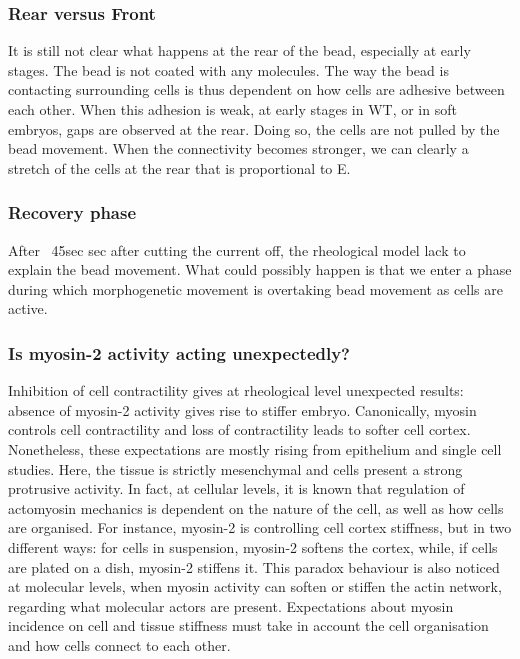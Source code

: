 \subsubsection{Rear versus Front}
It is still not clear what happens at the rear of the bead, especially at early stages.
The bead is not coated with any molecules.
The way the bead is contacting surrounding cells is thus dependent on how cells are adhesive between each other.
When this adhesion is weak, at early stages in WT, or in soft embryos, gaps are observed at the rear.
Doing so, the cells are not pulled by the bead movement.
When the connectivity becomes stronger, we can clearly a stretch of the cells at the rear that is proportional to E.

\subsubsection{Recovery phase}
After ~45sec sec after cutting the current off, the rheological model lack to explain the bead movement.
What could possibly happen is that we enter a phase during which morphogenetic movement is overtaking bead movement as cells are active.

\subsubsection{Is myosin-2 activity acting unexpectedly?}
Inhibition of cell contractility gives at rheological level unexpected results: absence of myosin-2 activity gives rise to stiffer embryo.
Canonically, myosin controls cell contractility and loss of contractility leads to softer cell cortex.
Nonetheless, these expectations are mostly rising from epithelium and single cell studies.
Here, the tissue is strictly mesenchymal and cells present a strong protrusive activity.
In fact, at cellular levels, it is known that regulation of actomyosin mechanics is dependent on the nature of the cell, as well as how cells are organised.
For instance, myosin-2 is controlling cell cortex stiffness, but in two different ways: for cells in suspension, myosin-2 softens the cortex, while, if cells are plated on a dish, myosin-2 stiffens it.
This paradox behaviour is also noticed at molecular levels, when myosin activity can soften or stiffen the actin network, regarding what molecular actors are present.
Expectations about myosin incidence on cell and tissue stiffness must take in account the cell organisation and how cells connect to each other.

